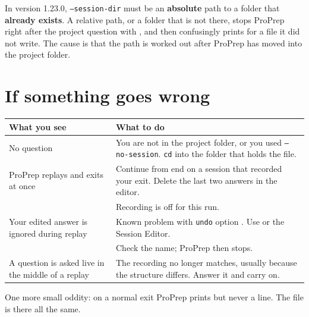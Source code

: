 \begin{watchout}
In version 1.23.0, \texttt{--session-dir} must be an \textbf{absolute} path to
a folder that \textbf{already exists}. A relative path, or a folder that is
not there, stops ProPrep right after the project question with
, and then confusingly
prints  for a file it did not write. The cause is
that the path is worked out after ProPrep has moved into the project folder.
\end{watchout}

\section{If something goes wrong}

\begin{tabularx}{\linewidth}{@{}lL@{}}
\toprule
\textbf{What you see} & \textbf{What to do} \\
\midrule
No  question & You are not in the
  project folder, or you used \texttt{--no-session}. \texttt{cd} into the
  folder that holds the  file. \\
ProPrep replays and exits at once & \textsf{Continue from end} on a session
  that recorded your exit. Delete the last two answers in the editor. \\
 & Recording is off for this run. \\
Your edited answer is ignored during replay & Known problem with
  \texttt{undo} option . Use  or the Session Editor. \\
 & Check the name; ProPrep then
  stops. \\
A question is asked live in the middle of a replay & The recording no longer
  matches, usually because the structure differs. Answer it and carry on. \\
\bottomrule
\end{tabularx}

\medskip
One more small oddity: on a normal exit ProPrep prints
 but never a 
line. The file is there all the same.
